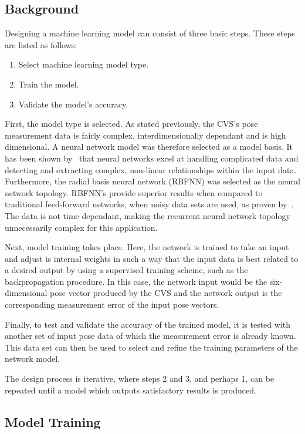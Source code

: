 \subsection{Background}

Designing a machine learning model can consist of three basic steps. These steps are listed as follows:

\begin{enumerate}
  \item Select machine learning model type.
  \item Train the model.
  \item Validate the model's accuracy. 
\end{enumerate}

First, the model type is selected. As stated previously, the CVS's pose measurement data is fairly complex, interdimensionally dependant and is high dimensional. A neural network model was therefore selected as a model basis. It has been shown by~\cite{tu1996advantages} that neural networks excel at handling complicated data and detecting and extracting complex, non-linear relationships within the input data. Furthermore, the radial basis neural network (RBFNN) was selected as the neural network topology. RBFNN's provide superior results when compared to traditional feed-forward networks, when noisy data sets are used, as proven by~\cite{xie2011comparison}. The data is not time dependant, making the recurrent neural network topology unnecessarily complex for this application.  

Next, model training takes place. Here, the network is trained to take an input and adjust is internal weights in such a way that the input data is best related to a desired output by using a supervised training scheme, such as the backpropagation procedure. In this case, the network input would be the six-dimensional pose vector produced by the CVS and the network output is the corresponding measurement error of the input pose vectors.  

Finally, to test and validate the accuracy of the trained model, it is tested with another set of input pose data of which the measurement error is already known. This data set can then be used to select and refine the training parameters of the network model. 

The design process is iterative, where steps 2 and 3, and perhaps 1, can be repeated until a model which outputs satisfactory results is produced. 

\subsection{Model Training}

